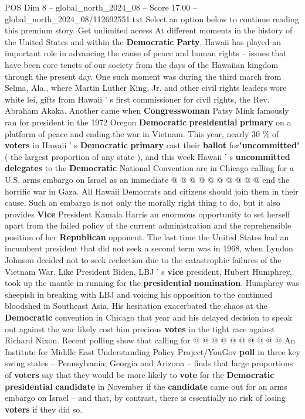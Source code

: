 \begin{textsample}{POS Dim 8 – global\_north\_2024\_08 – Score 17.00 – global\_north\_2024\_08/112692551.txt}  \label{ex:f8_pos_031}
Select an option below to continue reading this premium story.
Get unlimited access At different moments in the history of the United States and within the \textbf{Democratic} \textbf{Party}, Hawaii has played an important role in advancing the cause of peace and human rights -- issues that have been core tenets of our society from the days of the Hawaiian kingdom through the present day.
One such moment was during the third march from Selma, Ala., where Martin Luther King, Jr. and other civil rights leaders wore white lei, gifts from Hawaii ' s first commissioner for civil rights, the Rev.
Abraham Akaka.
Another came when \textbf{Congresswoman} Patsy Mink famously ran for president in the 1972 Oregon \textbf{Democratic} \textbf{presidential} \textbf{primary} on a platform of peace and ending the war in Vietnam.
This year, nearly 30 \% of \textbf{voters} in Hawaii ' s \textbf{Democratic} \textbf{primary} cast their \textbf{ballot} for"\textbf{uncommitted}"( the largest proportion of any state ), and this week Hawaii ' s \textbf{uncommitted} \textbf{delegates} to the \textbf{Democratic} National Convention are in Chicago calling for a U.S. arms embargo on Israel as an immediate @ @ @ @ @ @ @ @ @ @ end the horrific war in Gaza.
All Hawaii Democrats and citizens should join them in their cause.
Such an embargo is not only the morally right thing to do, but it also provides \textbf{Vice} President Kamala Harris an enormous opportunity to set herself apart from the failed policy of the current administration and the reprehensible position of her \textbf{Republican} opponent.
The last time the United States had an incumbent president that did not seek a second term was in 1968, when Lyndon Johnson decided not to seek reelection due to the catastrophic failures of the Vietnam War.
Like President Biden, LBJ ' s \textbf{vice} president, Hubert Humphrey, took up the mantle in running for the \textbf{presidential} \textbf{nomination}.
Humphrey was sheepish in breaking with LBJ and voicing his opposition to the continued bloodshed in Southeast Asia.
His hesitation exacerbated the chaos at the \textbf{Democratic} convention in Chicago that year and his delayed decision to speak out against the war likely cost him precious \textbf{votes} in the tight race against Richard Nixon.
Recent polling show that calling for @ @ @ @ @ @ @ @ @ @ An Institute for Middle East Understanding Policy Project/YouGov \textbf{poll} in three key swing states -- Pennsylvania, Georgia and Arizona -- finds that large proportions of \textbf{voters} say that they would be more likely to \textbf{vote} for the \textbf{Democratic} \textbf{presidential} \textbf{candidate} in November if the \textbf{candidate} came out for an arms embargo on Israel -- and that, by contrast, there is essentially no risk of losing \textbf{voters} if they did so.

\end{textsample}
